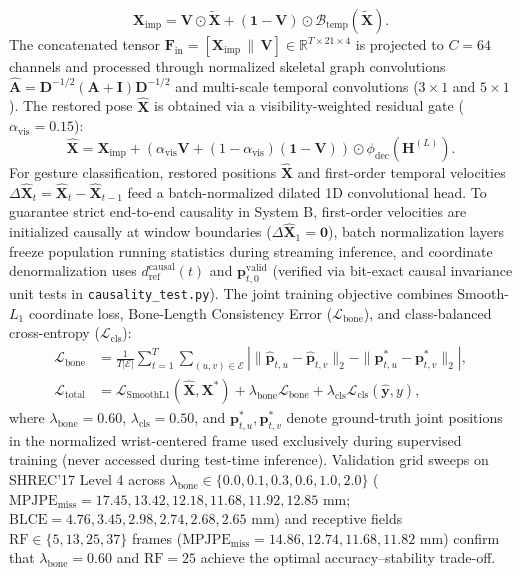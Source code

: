 \documentclass[10pt,twocolumn]{article}
\begin{document}
\begin{equation}
\mathbf{X}_{\text{imp}} = \mathbf{V} \odot \tilde{\mathbf{X}} + (\mathbf{1} - \mathbf{V}) \odot \mathcal{B}_{\text{temp}}(\tilde{\mathbf{X}}).
\end{equation}
The concatenated tensor $\mathbf{F}_{\text{in}} = [\mathbf{X}_{\text{imp}} \,\|\, \mathbf{V}] \in \mathbb{R}^{T \times 21 \times 4}$ is projected to $C=64$ channels and processed through normalized skeletal graph convolutions $\hat{\mathbf{A}} = \mathbf{D}^{-1/2}(\mathbf{A}+\mathbf{I})\mathbf{D}^{-1/2}$ \cite{yan2018spatial} and multi-scale temporal convolutions ($3\times 1$ and $5\times 1$). The restored pose $\hat{\mathbf{X}}$ is obtained via a visibility-weighted residual gate ($\alpha_{\text{vis}} = 0.15$):
\begin{equation}
\hat{\mathbf{X}} = \mathbf{X}_{\text{imp}} + \left(\alpha_{\text{vis}}\mathbf{V} + (1-\alpha_{\text{vis}})(\mathbf{1}-\mathbf{V})\right) \odot \phi_{\text{dec}}(\mathbf{H}^{(L)}).
\end{equation}
For gesture classification, restored positions $\hat{\mathbf{X}}$ and first-order temporal velocities $\Delta\hat{\mathbf{X}}_t = \hat{\mathbf{X}}_t - \hat{\mathbf{X}}_{t-1}$ feed a batch-normalized dilated 1D convolutional head. To guarantee strict end-to-end causality in System B, first-order velocities are initialized causally at window boundaries ($\Delta\hat{\mathbf{X}}_1 = \mathbf{0}$), batch normalization layers freeze population running statistics during streaming inference, and coordinate denormalization uses $d_{\text{ref}}^{\text{causal}}(t)$ and $\mathbf{p}_{t,0}^{\text{valid}}$ (verified via bit-exact causal invariance unit tests in \texttt{causality\_test.py}). The joint training objective combines Smooth-$L_1$ coordinate loss, Bone-Length Consistency Error ($\mathcal{L}_{\text{bone}}$), and class-balanced cross-entropy ($\mathcal{L}_{\text{cls}}$):
\begin{align}
\mathcal{L}_{\text{bone}} &= \frac{1}{T|\mathcal{E}|} \sum_{t=1}^{T} \sum_{(u,v)\in\mathcal{E}} \left| \|\hat{\mathbf{p}}_{t,u} - \hat{\mathbf{p}}_{t,v}\|_2 - \|\mathbf{p}^*_{t,u} - \mathbf{p}^*_{t,v}\|_2 \right|, \\
\mathcal{L}_{\text{total}} &= \mathcal{L}_{\text{SmoothL1}}(\hat{\mathbf{X}}, \mathbf{X}^*) + \lambda_{\text{bone}}\mathcal{L}_{\text{bone}} + \lambda_{\text{cls}}\mathcal{L}_{\text{cls}}(\hat{\mathbf{y}}, y),
\end{align}
where $\lambda_{\text{bone}} = 0.60$, $\lambda_{\text{cls}} = 0.50$, and $\mathbf{p}^*_{t,u}, \mathbf{p}^*_{t,v}$ denote ground-truth joint positions in the normalized wrist-centered frame used exclusively during supervised training (never accessed during test-time inference). Validation grid sweeps on SHREC'17 Level 4 across $\lambda_{\text{bone}} \in \{0.0, 0.1, 0.3, 0.6, 1.0, 2.0\}$ ($\text{MPJPE}_{\text{miss}} = 17.45, 13.42, 12.18, \mathbf{11.68}, 11.92, 12.85\text{ mm}$; $\text{BLCE} = 4.76, 3.45, 2.98, \mathbf{2.74}, 2.68, 2.65\text{ mm}$) and receptive fields $\text{RF} \in \{5, 13, 25, 37\}$ frames ($\text{MPJPE}_{\text{miss}} = 14.86, 12.74, \mathbf{11.68}, 11.82\text{ mm}$) confirm that $\lambda_{\text{bone}} = 0.60$ and $\text{RF} = 25$ achieve the optimal accuracy--stability trade-off.
\end{document}
